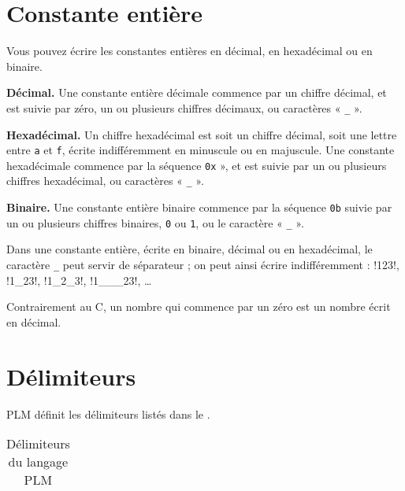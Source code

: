 
\section{Constante entière}

Vous pouvez écrire les constantes entières en décimal, en hexadécimal ou en binaire. 

\textbf{Décimal.} Une constante entière décimale commence par un chiffre décimal, et est suivie par zéro, un ou plusieurs chiffres décimaux, ou caractères « \texttt{\_} ».

\textbf{Hexadécimal.} Un chiffre hexadécimal est soit un chiffre décimal, soit une lettre entre \texttt{a} et \texttt{f}, écrite indifféremment en minuscule ou en majuscule. Une constante hexadécimale commence par la séquence \texttt{0x} », et est suivie par un ou plusieurs chiffres hexadécimal, ou caractères « \texttt{\_} ».

\textbf{Binaire.} Une constante entière binaire commence par la séquence \texttt{0b} suivie par un ou plusieurs chiffres binaires, \texttt{0} ou \texttt{1}, ou le caractère « \texttt{\_} ».

Dans une constante entière, écrite en binaire, décimal ou en hexadécimal, le caractère \texttt{\_} peut servir de séparateur ; on peut ainsi écrire indifféremment : \plm!123!, \plm!1_23!, \plm!1_2_3!, \plm!1___23!, \dots

Contrairement au C, un nombre qui commence par un zéro est un nombre écrit en décimal.

\section{Délimiteurs}

PLM définit les délimiteurs listés dans le .

\begin{table}[!t]
  \centering
  \begin{tabular}{llllllllllllll}
    
  \end{tabular}
  \caption{Délimiteurs du langage PLM}
  \ligne
\end{table}

